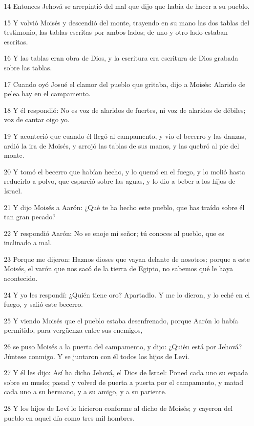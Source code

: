 \par 14 Entonces Jehová se arrepintió del mal que dijo que había de hacer a su pueblo.
\par 15 Y volvió Moisés y descendió del monte, trayendo en su mano las dos tablas del testimonio, las tablas escritas por ambos lados; de uno y otro lado estaban escritas.
\par 16 Y las tablas eran obra de Dios, y la escritura era escritura de Dios grabada sobre las tablas.
\par 17 Cuando oyó Josué el clamor del pueblo que gritaba, dijo a Moisés: Alarido de pelea hay en el campamento.
\par 18 Y él respondió: No es voz de alaridos de fuertes, ni voz de alaridos de débiles; voz de cantar oigo yo.
\par 19 Y aconteció que cuando él llegó al campamento, y vio el becerro y las danzas, ardió la ira de Moisés, y arrojó las tablas de sus manos, y las quebró al pie del monte.
\par 20 Y tomó el becerro que habían hecho, y lo quemó en el fuego, y lo molió hasta reducirlo a polvo, que esparció sobre las aguas, y lo dio a beber a los hijos de Israel.
\par 21 Y dijo Moisés a Aarón: ¿Qué te ha hecho este pueblo, que has traído sobre él tan gran pecado?
\par 22 Y respondió Aarón: No se enoje mi señor; tú conoces al pueblo, que es inclinado a mal.
\par 23 Porque me dijeron: Haznos dioses que vayan delante de nosotros; porque a este Moisés, el varón que nos sacó de la tierra de Egipto, no sabemos qué le haya acontecido.
\par 24 Y yo les respondí: ¿Quién tiene oro? Apartadlo. Y me lo dieron, y lo eché en el fuego, y salió este becerro.
\par 25 Y viendo Moisés que el pueblo estaba desenfrenado, porque Aarón lo había permitido, para vergüenza entre sus enemigos,
\par 26 se puso Moisés a la puerta del campamento, y dijo: ¿Quién está por Jehová? Júntese conmigo. Y se juntaron con él todos los hijos de Leví.
\par 27 Y él les dijo: Así ha dicho Jehová, el Dios de Israel: Poned cada uno su espada sobre su muslo; pasad y volved de puerta a puerta por el campamento, y matad cada uno a su hermano, y a su amigo, y a su pariente.
\par 28 Y los hijos de Leví lo hicieron conforme al dicho de Moisés; y cayeron del pueblo en aquel día como tres mil hombres.
